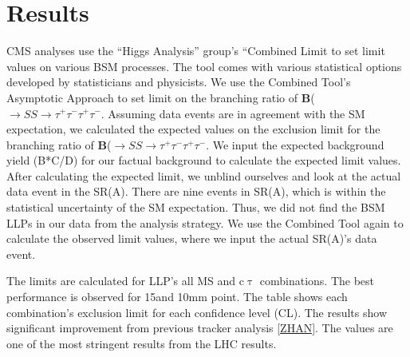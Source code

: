 \clearpage
\chapter{Results}\label{sec:results}
CMS analyses use the ``Higgs Analysis'' group's ``Combined Limit to set limit values on various BSM processes.
The tool comes with various statistical options developed by statisticians and physicists.
We use the Combined Tool's Asymptotic Approach to set limit on the branching ratio of \textbf{B}(\PH$\to SS \to \tau^{+}\tau^{-}\tau^{+}\tau^{-}$.
Assuming data events are in agreement with the SM expectation, we calculated the expected values on the exclusion limit for the branching ratio of \textbf{B}(\PH$\to SS \to \tau^{+}\tau^{-}\tau^{+}\tau^{-}$.
We input the expected background yield (B*C/D) for our factual background to calculate the expected limit values.
After calculating the expected limit, we unblind ourselves and look at the actual data event in the SR(A).
There are nine events in SR(A), which is within the statistical uncertainty of the SM expectation.
Thus, we did not find the BSM LLPs in our data from the analysis strategy.
We use the Combined Tool again to calculate the observed limit values, where we input the actual SR(A)'s data event.

The limits are calculated for LLP's all MS and c$\uptau$ combinations.
The best performance is observed for 15\GeV and 10mm point.
The table shows each combination's exclusion limit for each confidence level (CL).
The results show significant improvement from previous tracker analysis \ref{ZHAN}.
The values are one of the most stringent results from the LHC results.



